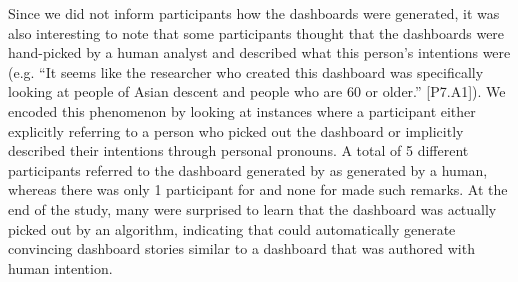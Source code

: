 \par Since we did not inform participants how the dashboards were generated, it was also interesting to note that some participants thought that the dashboards were hand-picked by a human analyst and described what this person's intentions were (e.g. ``It seems like the researcher who created this dashboard was specifically looking at people of Asian descent and people who are 60 or older.'' [P7.A1]). We encoded this phenomenon by looking at instances where a participant either explicitly referring to a person who picked out the dashboard or implicitly described their intentions through personal pronouns. A total of 5 different participants referred to the dashboard generated by \system as generated by a human, whereas there was only 1 participant for \cluster and none for \BFS made such remarks. At the end of the study, many were surprised to learn that the \system dashboard was actually picked out by an algorithm, indicating that \system could automatically generate convincing dashboard stories similar to a dashboard that was authored with human intention.

